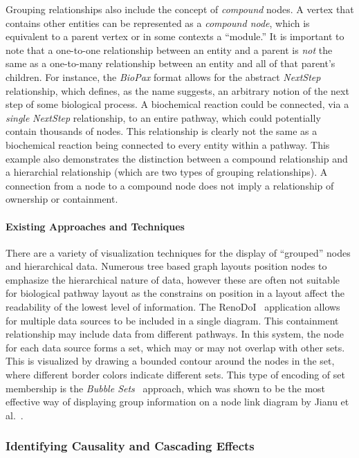 \documentclass[twocolumn]{bmcart}%
\begin{document}
Grouping relationships also include the concept of \textit{compound} nodes.
A vertex that contains other entities can be represented as a \textit{compound node}, which is equivalent to a parent vertex or in some contexts a ``module.''
It is important to note that a one-to-one relationship between an entity and a parent is \textit{not} the same as a one-to-many relationship between an entity and all of that parent's children.
For instance, the \textit{BioPax} format allows for the abstract \emph{NextStep} relationship, which defines, as the name suggests, an arbitrary notion of the next step of some biological process.
A biochemical reaction could be connected, via a \textit{single} \emph{NextStep} relationship, to an entire pathway, which could potentially contain thousands of nodes.
This relationship is clearly not the same as a biochemical reaction being connected to every entity within a pathway.
This example also demonstrates the distinction between a compound relationship and a hierarchial relationship (which are two types of grouping relationships).
A connection from a node to a compound node does not imply a relationship of ownership or containment.

\paragraph*{Existing Approaches and Techniques}

There are a variety of visualization techniques for the display of ``grouped'' nodes and hierarchical data.
Numerous tree based graph layouts position nodes to emphasize the hierarchical nature of data, however these are often not suitable for biological pathway layout as the constrains on position in a layout affect the readability of the lowest level of information.
The RenoDoI~\cite{Vehlow2015} application allows for multiple data sources to be included in a single diagram.
This containment relationship may include data from different pathways.
In this system, the node for each data source forms a set, which may or may not overlap with other sets.
This is visualized by drawing a bounded contour around the nodes in the set, where different border colors indicate different sets.
This type of encoding of set membership is the \textit{Bubble Sets}~\cite{Collins2009} approach, which was shown to be the most effective way of displaying group information on a node link diagram by Jianu et al.~\cite{Jianu2014}.

\subsubsection*{Identifying Causality and Cascading Effects}
\end{document}
